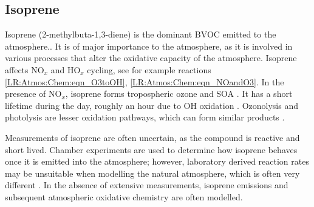   \subsection{Isoprene}
  \label{LR:VOCs:Isop}
    Isoprene (2-methylbuta-1,3-diene) is the dominant BVOC emitted to the 
    atmosphere.. 
    It is of major importance to the atmosphere, as it is involved in various processes that alter the oxidative capacity of the atmosphere.
    Isoprene affects NO$_x$ and HO$_x$ cycling, see for example reactions 
    \ref{LR:Atmos:Chem:eqn_O3toOH}, \ref{LR:Atmos:Chem:eqn_NOandO3}.
    In the presence of NO$_x$, isoprene forms tropospheric ozone and SOA 
    \parencite{Wagner2002, Millet2006}.
    It has a short lifetime during the day, roughly an hour due to OH oxidation 
    \parencite{AtkinsonArey2003}.
    Ozonolysis and photolysis are lesser oxidation pathways, which can form 
    similar products \parencite{Nguyen2016,Wolfe2016}.
    
    Measurements of isoprene are often uncertain, as the compound is reactive and short lived.
    Chamber experiments are used to determine how isoprene behaves once it is emitted into the atmosphere; however, laboratory derived reaction rates may be unsuitable when modelling the natural atmosphere, which is often very different \parencite{Kanakidou2005,Nguyen2014}.
    In the absence of extensive measurements, isoprene emissions and subsequent 
    atmospheric oxidative chemistry are often modelled.
    
